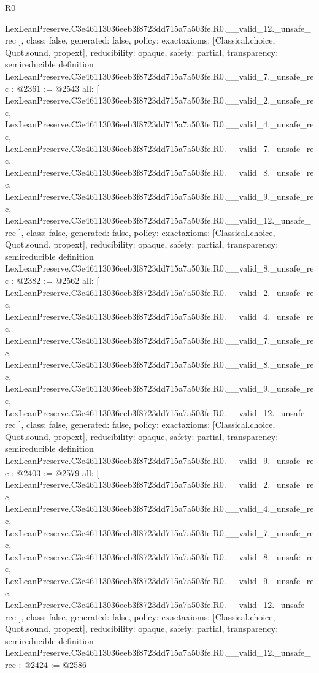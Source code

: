 \begin{lexlean}{R0}
\begin{coremodule}
{    LexLeanPreserve.C3e46113036eeb3f8723dd715a7a503fe.R0.__valid_12._unsafe_rec
  ],
  class: false,
  generated: false,
  policy: exact{axioms: [Classical.choice, Quot.sound, propext]},
  reducibility: opaque{},
  safety: partial,
  transparency: semireducible
}
definition LexLeanPreserve.C3e46113036eeb3f8723dd715a7a503fe.R0.__valid_7._unsafe_rec : @2361 := @2543 {
  all: [
    LexLeanPreserve.C3e46113036eeb3f8723dd715a7a503fe.R0.__valid_2._unsafe_rec,
    LexLeanPreserve.C3e46113036eeb3f8723dd715a7a503fe.R0.__valid_4._unsafe_rec,
    LexLeanPreserve.C3e46113036eeb3f8723dd715a7a503fe.R0.__valid_7._unsafe_rec,
    LexLeanPreserve.C3e46113036eeb3f8723dd715a7a503fe.R0.__valid_8._unsafe_rec,
    LexLeanPreserve.C3e46113036eeb3f8723dd715a7a503fe.R0.__valid_9._unsafe_rec,
    LexLeanPreserve.C3e46113036eeb3f8723dd715a7a503fe.R0.__valid_12._unsafe_rec
  ],
  class: false,
  generated: false,
  policy: exact{axioms: [Classical.choice, Quot.sound, propext]},
  reducibility: opaque{},
  safety: partial,
  transparency: semireducible
}
definition LexLeanPreserve.C3e46113036eeb3f8723dd715a7a503fe.R0.__valid_8._unsafe_rec : @2382 := @2562 {
  all: [
    LexLeanPreserve.C3e46113036eeb3f8723dd715a7a503fe.R0.__valid_2._unsafe_rec,
    LexLeanPreserve.C3e46113036eeb3f8723dd715a7a503fe.R0.__valid_4._unsafe_rec,
    LexLeanPreserve.C3e46113036eeb3f8723dd715a7a503fe.R0.__valid_7._unsafe_rec,
    LexLeanPreserve.C3e46113036eeb3f8723dd715a7a503fe.R0.__valid_8._unsafe_rec,
    LexLeanPreserve.C3e46113036eeb3f8723dd715a7a503fe.R0.__valid_9._unsafe_rec,
    LexLeanPreserve.C3e46113036eeb3f8723dd715a7a503fe.R0.__valid_12._unsafe_rec
  ],
  class: false,
  generated: false,
  policy: exact{axioms: [Classical.choice, Quot.sound, propext]},
  reducibility: opaque{},
  safety: partial,
  transparency: semireducible
}
definition LexLeanPreserve.C3e46113036eeb3f8723dd715a7a503fe.R0.__valid_9._unsafe_rec : @2403 := @2579 {
  all: [
    LexLeanPreserve.C3e46113036eeb3f8723dd715a7a503fe.R0.__valid_2._unsafe_rec,
    LexLeanPreserve.C3e46113036eeb3f8723dd715a7a503fe.R0.__valid_4._unsafe_rec,
    LexLeanPreserve.C3e46113036eeb3f8723dd715a7a503fe.R0.__valid_7._unsafe_rec,
    LexLeanPreserve.C3e46113036eeb3f8723dd715a7a503fe.R0.__valid_8._unsafe_rec,
    LexLeanPreserve.C3e46113036eeb3f8723dd715a7a503fe.R0.__valid_9._unsafe_rec,
    LexLeanPreserve.C3e46113036eeb3f8723dd715a7a503fe.R0.__valid_12._unsafe_rec
  ],
  class: false,
  generated: false,
  policy: exact{axioms: [Classical.choice, Quot.sound, propext]},
  reducibility: opaque{},
  safety: partial,
  transparency: semireducible
}
definition LexLeanPreserve.C3e46113036eeb3f8723dd715a7a503fe.R0.__valid_12._unsafe_rec : @2424 := @2586 {
}
\end{coremodule}
\end{lexlean}
